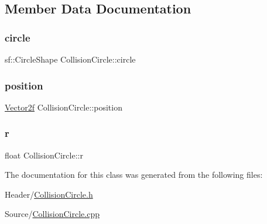 \subsection{Member Data Documentation}
\mbox{\label{class_collision_circle_ad75e824f03cb2854683bb46c1119d6b3}} 
\subsubsection{\texorpdfstring{circle}{circle}}
{\footnotesize\ttfamily sf\+::\+Circle\+Shape Collision\+Circle\+::circle}

\mbox{\label{class_collision_circle_aa4e6b93eba15c97b3253dd4518fbcc30}} 
\subsubsection{\texorpdfstring{position}{position}}
{\footnotesize\ttfamily \mbox{\hyperlink{class_vector2f}{Vector2f}} Collision\+Circle\+::position}

\mbox{\label{class_collision_circle_a7f23e968ae19c24c7ca568875b5dd20b}} 
\subsubsection{\texorpdfstring{r}{r}}
{\footnotesize\ttfamily float Collision\+Circle\+::r}



The documentation for this class was generated from the following files\+:\begin{DoxyCompactItemize}
\item 
Header/\mbox{\hyperlink{_collision_circle_8h}{Collision\+Circle.\+h}}\item 
Source/\mbox{\hyperlink{_collision_circle_8cpp}{Collision\+Circle.\+cpp}}\end{DoxyCompactItemize}
